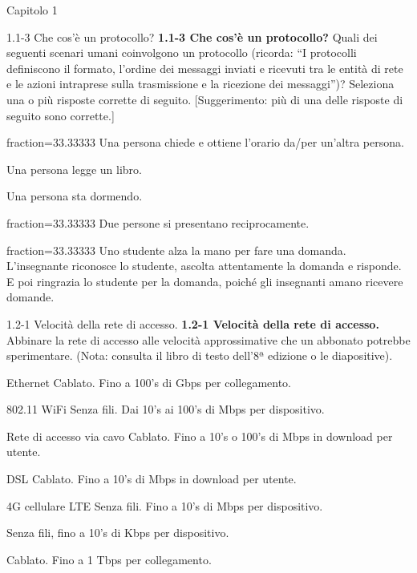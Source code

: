 \documentclass[a4paper]{article}
\begin{document}
\begin{quiz}{Capitolo 1}


\begin{multi}[points=1,shuffle=true,multiple]{1.1-3 Che cos'è un protocollo?}
\textbf{1.1-3 Che cos'è un protocollo?} 
Quali dei seguenti scenari umani coinvolgono un protocollo 
(ricorda: ``I protocolli definiscono il formato, l'ordine dei messaggi inviati e ricevuti tra le entità di rete e le azioni intraprese sulla trasmissione e la ricezione dei messaggi'')? 
Seleziona una o più risposte corrette di seguito. [Suggerimento: più di una delle risposte di seguito sono corrette.]

\item[fraction=33.33333] Una persona chiede e ottiene l'orario da/per un'altra persona.
\item Una persona legge un libro.
\item Una persona sta dormendo.
\item[fraction=33.33333] Due persone si presentano reciprocamente.
\item[fraction=33.33333] Uno studente alza la mano per fare una domanda. L'insegnante riconosce lo studente, ascolta attentamente la domanda e risponde. E poi ringrazia lo studente per la domanda, poiché gli insegnanti amano ricevere domande.
\end{multi}

\begin{matching}[points=1,shuffle=true]{1.2-1 Velocità della rete di accesso.}
\textbf{1.2-1 Velocità della rete di accesso.}
Abbinare la rete di accesso alle velocità approssimative che un abbonato potrebbe sperimentare.
(Nota: consulta il libro di testo dell'8ª edizione o le diapositive).

\item Ethernet \answer Cablato. Fino a 100's di Gbps per collegamento.
\item 802.11 WiFi \answer Senza fili. Dai 10's ai 100's di Mbps per dispositivo.
\item Rete di accesso via cavo \answer Cablato. Fino a 10's o 100's di Mbps in download per utente.
\item DSL \answer Cablato. Fino a 10's di Mbps in download per utente.
\item 4G cellulare LTE \answer Senza fili. Fino a 10's di Mbps per dispositivo.
\item \answer Senza fili, fino a 10's di Kbps per dispositivo.
\item \answer Cablato. Fino a 1 Tbps per collegamento.
\end{matching}


\end{quiz}
\end{document}

